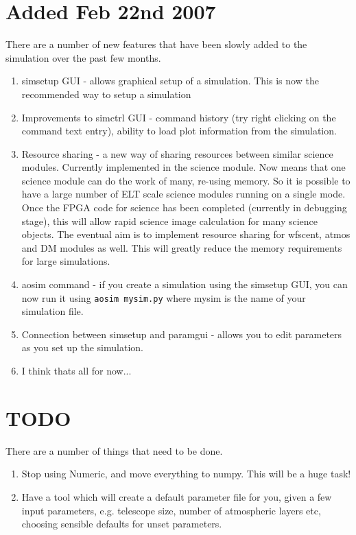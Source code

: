 \documentclass{article}
\begin{document}
\section{Added Feb 22nd 2007}
There are a number of new features that have been slowly added to the
simulation over the past few months.
\begin{enumerate}
\item simsetup GUI - allows graphical setup of a simulation.  This is
  now the recommended way to setup a simulation
\item Improvements to simctrl GUI - command history (try right
  clicking on the command text entry), ability to load
  plot information from the simulation.
\item Resource sharing - a new way of sharing resources between
  similar science modules.  Currently implemented in the science
  module.  Now means that one science module can do the work of many,
  re-using memory.  So it is possible to have a large number of ELT
  scale science modules running on a single mode.  Once the FPGA code
  for science has been completed (currently in debugging stage), this
  will allow rapid science image calculation for many science objects.
  The eventual aim is to implement resource sharing for wfscent, atmos
  and DM modules as well.  This will greatly reduce the memory
  requirements for large simulations.
\item aosim command - if you create a simulation using the simsetup
  GUI, you can now run it using \texttt{aosim mysim.py} where mysim is
  the name of your simulation file.
\item Connection between simsetup and paramgui - allows you to edit
  parameters as you set up the simulation.
\item I think thats all for now...
\end{enumerate}

\section{TODO}
There are a number of things that need to be done.
\begin{enumerate}
\item Stop using Numeric, and move everything to numpy.  This will be
  a huge task!
\item Have a tool which will create a default parameter file for you,
  given a few input parameters, e.g. telescope size, number of
  atmospheric layers etc, choosing sensible defaults for unset
  parameters. 
\end{enumerate}



\printindex
\end{document}
